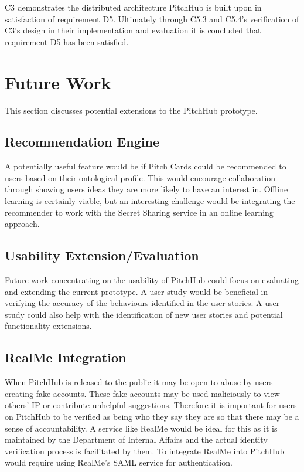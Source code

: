 C3 demonstrates the distributed architecture PitchHub is built upon in satisfaction of requirement D5. Ultimately through C5.3 and C5.4's verification of C3's design in their implementation and evaluation it is concluded that requirement D5 has been satisfied.

\section{Future Work}

This section discusses potential extensions to the PitchHub prototype.

\subsection{Recommendation Engine}

A potentially useful feature would be if Pitch Cards could be recommended to users based on their ontological profile. This would encourage collaboration through showing users ideas they are more likely to have an interest in. Offline learning is certainly viable, but an interesting challenge would be integrating the recommender to work with the Secret Sharing service in an online learning approach.

\subsection{Usability Extension/Evaluation}

Future work concentrating on the usability of PitchHub could focus on evaluating and extending the current prototype. A user study would be beneficial in verifying the accuracy of the behaviours identified in the user stories. A user study could also help with the identification of new user stories and potential functionality extensions. 

\subsection{RealMe Integration}

When PitchHub is released to the public it may be open to abuse by users creating fake accounts. These fake accounts may be used maliciously to view others' IP or contribute unhelpful suggestions. Therefore it is important for users on PitchHub to be verified as being who they say they are so that there may be a sense of accountability. A service like RealMe would be ideal for this as it is maintained by the Department of Internal Affairs and the actual identity verification process is facilitated by them. To integrate RealMe into PitchHub would require using RealMe's SAML service for authentication.